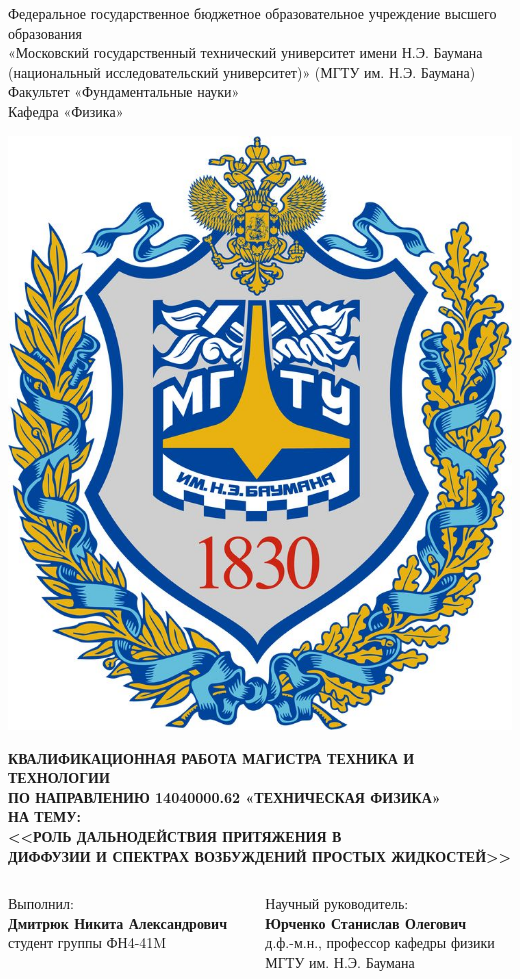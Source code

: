 \documentclass{beamer} %
\begin{document}
\begin{frame}
  \begin{center}\tiny
    Федеральное государственное бюджетное образовательное учреждение высшего образования \\
    «Московский государственный технический университет имени Н.Э. Баумана (национальный исследовательский университет)» (МГТУ им. Н.Э. Баумана)\\
    Факультет «Фундаментальные науки»\\
    Кафедра «Физика»
  \end{center}

  \begin{center}
    \includegraphics[width=0.15\linewidth]{emb}
  \end{center}

  \begin{center}\tiny
    \textbf{КВАЛИФИКАЦИОННАЯ РАБОТА МАГИСТРА ТЕХНИКА И ТЕХНОЛОГИИ \\ ПО НАПРАВЛЕНИЮ 14040000.62 «ТЕХНИЧЕСКАЯ ФИЗИКА»}\\
    \vspace{0.2cm}
    \textbf{НА ТЕМУ:}\\
    \vspace{0.1cm}
    \textbf{<<РОЛЬ ДАЛЬНОДЕЙСТВИЯ ПРИТЯЖЕНИЯ В \\ ДИФФУЗИИ И СПЕКТРАХ ВОЗБУЖДЕНИЙ ПРОСТЫХ ЖИДКОСТЕЙ>>}
  \end{center}

  \vspace{0.3cm}

  \begin{columns}
    \begin{column}{0.50\textwidth}
      \begin{center}\tiny
        Выполнил: \\
        \vspace{0.1cm}
        \textbf{Дмитрюк Никита Александрович}\\
        студент группы ФН4-41M \\
      \end{center}
    \end{column}

    \begin{column}{0.50\textwidth}
      \begin{center}\tiny
        Научный руководитель:\\
        \vspace{0.1cm}
        \textbf{Юрченко Станислав Олегович} \\
        д.ф.-м.н., профессор кафедры физики\\
        МГТУ им. Н.Э. Баумана \\
      \end{center}
    \end{column}
  \end{columns}


\end{frame}
\end{document}
